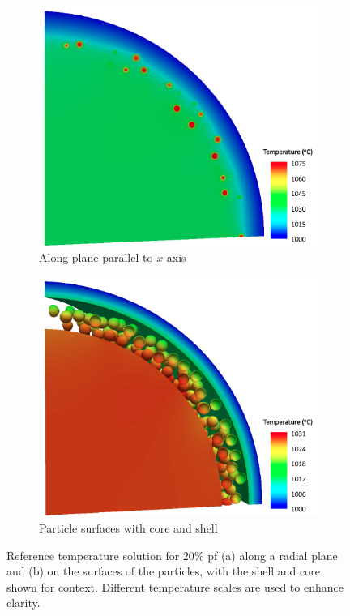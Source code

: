 \begin{figure}[!htb]
\centering
\begin{subfigure}{.475\textwidth}
  \centering
  \includegraphics[width=\linewidth]{figs/fhr_fuel3.png}
  \caption{Along plane parallel to \(x\) axis}
  \label{fig:octant1}
\end{subfigure}
\begin{subfigure}{.475\textwidth}
  \centering
  \includegraphics[width=\linewidth]{figs/fhr_fuel2.png}
  \caption{Particle surfaces with core and shell}
  \label{fig:octant2}
\end{subfigure}
\caption{Reference temperature solution for \(20\)\% \gls{pf} (a) along a radial plane and (b) on the surfaces of the particles, with the shell and core shown for context. Different temperature scales are used to enhance clarity.}
\label{fig:pebble_octant_ref}
\end{figure}

